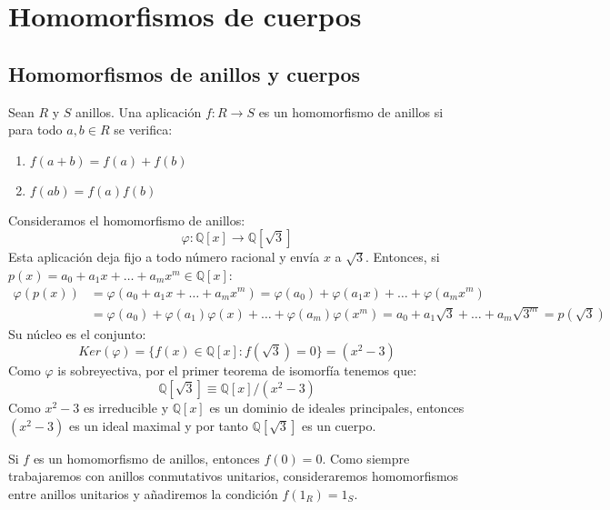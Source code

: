 \chapter{Homomorfismos de cuerpos}
\section{Homomorfismos de anillos y cuerpos}

\begin{definition}
    Sean $R$ y $S$ anillos. Una aplicación $f : R \to S$ es un homomorfismo de anillos si para todo $a, b \in R$ se verifica:
    \begin{enumerate}
        \item $f(a + b) = f(a) + f(b)$
        \item $f(ab) = f(a) f(b)$
    \end{enumerate}
\end{definition}

\begin{example}
    Consideramos el homomorfismo de anillos:
    $$\varphi : \mathbb{Q}[x] \to \mathbb{Q}[\sqrt{3}]$$
    Esta aplicación deja fijo a todo número racional y envía $x$ a $\sqrt{3}$.
    Entonces, si $p(x) = a_0 + a_1x + \dots + a_mx^m \in \mathbb{Q}[x]$:
    \begin{align*}
        \varphi(p(x)) & = \varphi(a_0 + a_1x + \dots + a_mx^m) = \varphi(a_0) + \varphi(a_1x) + \dots + \varphi(a_mx^m)                   \\
                      & = \varphi(a_0) + \varphi(a_1)\varphi(x) + \dots + \varphi(a_m)\varphi(x^m) = a_0 + a_1\sqrt{3} + \dots + a_m\sqrt{3^m} = p(\sqrt{3})
    \end{align*}
    Su núcleo es el conjunto:
    $$Ker(\varphi) = \{ f(x) \in \mathbb{Q}[x] : f(\sqrt{3}) = 0 \} = (x^2 - 3)$$
    Como $\varphi$ is sobreyectiva, por el primer teorema de isomorfía tenemos que:
    $$\mathbb{Q}[\sqrt{3}] \equiv \mathbb{Q}[x] / (x^2 - 3)$$
    Como $x^2 - 3$ es irreducible y $\mathbb{Q}[x]$ es un dominio de ideales principales, entonces $(x^2 - 3)$ es un ideal maximal y por tanto $\mathbb{Q}[\sqrt{3}]$ es un cuerpo.
\end{example}

\begin{remark}
    Si $f$ es un homomorfismo de anillos, entonces $f(0) = 0$. Como siempre trabajaremos con anillos conmutativos unitarios, consideraremos homomorfismos entre anillos unitarios y añadiremos la condición $f(1_R) = 1_S$.
\end{remark}

